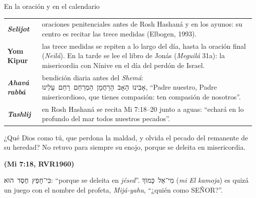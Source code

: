 \documentclass[hyperref={bookmarks=false},aspectratio=169]{beamer}
\newcommand{\heb}[1]{\mbox{\foreignlanguage{hebrew}{#1}}}
\newcommand{\SENOR}{S{\fontsize{0.78em}{1em}\selectfont EÑOR}}
\newcommand{\fuente}[1]{\par\hfill{\upshape\bfseries\footnotesize\textcolor{azul}{#1}}}
\begin{document}
\begin{frame}{En la oración y en el calendario}
\scriptsize\renewcommand{\arraystretch}{1.2}
\begin{tabular}{@{}>{\RaggedRight\arraybackslash}p{2.6cm}>{\RaggedRight\arraybackslash}p{9.2cm}@{}}
\toprule
\textbf{\emph{Selijot}} & oraciones penitenciales antes de Rosh Hashaná y en los ayunos: su centro es recitar las trece medidas (Elbogen, 1993). \\
\textbf{Yom Kipur} & las trece medidas se repiten a lo largo del día, hasta la oración final (\emph{Neilá}). En la tarde se lee el libro de Jonás (\emph{Meguilá} 31a): la misericordia con Nínive en el día del perdón de Israel. \\
\textbf{\emph{Ahavá rabbá}} & bendición diaria antes del \emph{Shemá}: \heb{אָבִינוּ הָאָב הָרַחֲמָן הַמְרַחֵם רַחֵם עָלֵינוּ}, ``Padre nuestro, Padre misericordioso, que tienes compasión: ten compasión de nosotros''. \\
\textbf{\emph{Tashlij}} & en Rosh Hashaná se recita Mi 7:18--20 junto a aguas: ``echará en lo profundo del mar todos nuestros pecados''. \\
\bottomrule
\end{tabular}\par\medskip
\begin{cita}¿Qué Dios como tú, que perdona la maldad, y olvida el pecado del remanente de su heredad? No retuvo para siempre su enojo, porque se deleita en misericordia.\fuente{(Mi 7:18, RVR1960)}\end{cita}
\scriptsize\heb{כִּי־חָפֵץ חֶסֶד הוּא}: ``porque se deleita en \emph{jésed}''. \heb{מִי־אֵל כָּמוֹךָ} (\emph{mi El kamoja}) es quizá un juego con el nombre del profeta, \emph{Mijá-yahu}, ``¿quién como \SENOR?''.
\end{frame}
\end{document}
